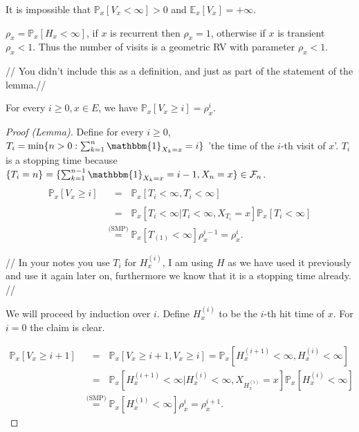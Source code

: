 \begin{rmk}[]
It is impossible that $\mathbb{P}_{x} \left[ V_x<\infty \right] >0 $ and $\mathbb{E}_{x} \left[ V_x \right] =+\infty$.
\end{rmk}

\begin{defn}
	$\rho_x = \mathbb{P}_{x} \left[ H_x<\infty \right]$, {\color{blue}if $x$ is recurrent then $\rho_x=1$, otherwise if $x$ is transient $\rho_x<1$. Thus the number of visits is a geometric RV with parameter $\rho_x<1$.}
\end{defn}
{\color{blue} // You didn't include this as a definition, and just as part of the statement of the lemma.//}

\begin{lemma}[]
	For every $i\geq 0, x \in E$, we have $\mathbb{P}_{x} \left[ V_x \geq i \right] = \rho_x^{i}$.
\end{lemma}

\begin{proof}[Proof (Lemma)]
	Define for every $i\geq 0$, $T_{i}= \min\{n > 0: \sum_{k=1}^{n} \mathbbm{1}_{X_k =x} =i \}$ 'the time of the $i$-th visit of $x$'. $T_{i}$ is a stopping time because $\{T_{i}=n\}=\{\sum_{k=1}^{n-1} \mathbbm{1}_{X_k=x} =i-1, X_n =x\} \in \mathcal{F}_n $.
	\begin{align}
		\mathbb{P}_{x} \left[ V_x \geq i \right] &\stackrel{\phantom{\text{(SMP)}}}{=} \mathbb{P}_{x} \left[ T_{i} < \infty, T_{i} < \infty \right] \\
		&\stackrel{\phantom{\text{(SMP)}}}{=} \mathbb{P}_{x} \left[ T_{i} < \infty | T_{i} < \infty, X_{T_{i}}=x \right] \mathbb{P}_{x} \left[ T_{i} < \infty \right] \\
		&\stackrel{\text{(SMP)}}{=} \mathbb{P}_{x} \left[ T_{(1)} < \infty \right] \rho_x^{i-1} = \rho_x^{i}   
	.\end{align}
	{\color{blue}// In your notes you use $T_i$ for $H_x^{(i)}$, I am using $H$ as we have used it previously and use it again later on, furthermore we know that it is a stopping time already. //

	We will proceed by induction over $i$. Define $H_x^{(i)}$ to be the $i$-th hit time of $x$. For $i=0$ the claim is clear.

	\begin{align}
		\mathbb{P}_{x} \left[ V_x \geq i+1 \right] &\stackrel{\phantom{\text{(SMP)}}}{=} \mathbb{P}_{x} \left[ V_x \geq i+1, V_x \geq i \right] = \mathbb{P}_{x} \left[ H_x^{(i+1)} < \infty, H_x^{(i)} < \infty \right] \\
		&\stackrel{\phantom{\text{(SMP)}}}{=} \mathbb{P}_{x} \left[ H_x^{(i+1)} < \infty | H_x^{(i)} < \infty, X_{H_x^{(i)}}=x \right] \mathbb{P}_{x} \left[ H_x^{(i)} < \infty \right] \\
		&\stackrel{\text{(SMP)}}{=} \mathbb{P}_{x} \left[ H_x^{(1)} < \infty \right] \rho_x^i = \rho_x^{i+1}   
	.\end{align}
}
\end{proof}

